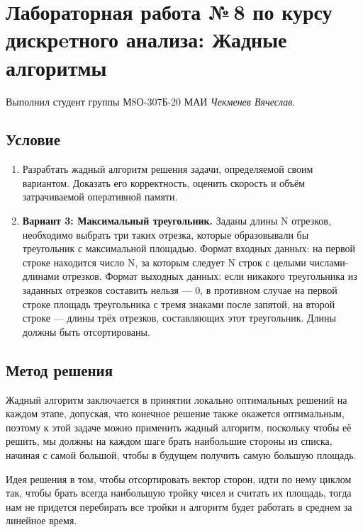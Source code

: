 \documentclass[12pt]{article}
\begin{document}
    \section*{Лабораторная работа №\,8 по курсу дискрeтного анализа: 
    Жадные алгоритмы}

    Выполнил студент группы М8О-307Б-20 МАИ \textit{Чекменев Вячеслав}.

    \subsection*{Условие}
 
    \begin{enumerate}
    \item Разрабтать жадный алгоритм решения задачи, определяемой своим
    вариантом. Доказать его корректность, оценить скорость и объём
    затрачиваемой оперативной памяти.
    \item \textbf{Вариант 3: Максимальный треугольник.} Заданы длины N отрезков, необходимо выбрать три таких отрезка,
    которые образовывали бы треугольник с максимальной площадью.
    Формат входных данных: на первой строке находится число N, за
    которым следует N строк с целыми числами-длинами отрезков. Формат
    выходных данных: если никакого треугольника из заданных отрезков
    составить нельзя — 0, в противном случае на первой строке площадь
    треугольника с тремя знаками после запятой, на второй строке — длины
    трёх отрезков, составляющих этот треугольник. Длины должны быть
    отсортированы.
    \end{enumerate}

    \subsection*{Метод решения}

        Жадный алгоритм заключается в принятии локально оптимальных решений на каждом этапе, допуская, что конечное решение также окажется оптимальным, поэтому к этой задаче можно применить жадный 
    алгоритм, поскольку чтобы её решить, мы должны на каждом шаге брать наибольшие стороны из списка, начиная с самой большой, чтобы в будущем получить самую большую площадь.
    
    Идея решения в том, чтобы отсортировать вектор сторон, идти по нему циклом так, чтобы брать всегда наибольшую тройку чисел и считать их площадь, тогда нам не придется перебирать все тройки и алгоритм будет работать в среднем за линейное время.
\end{document}
